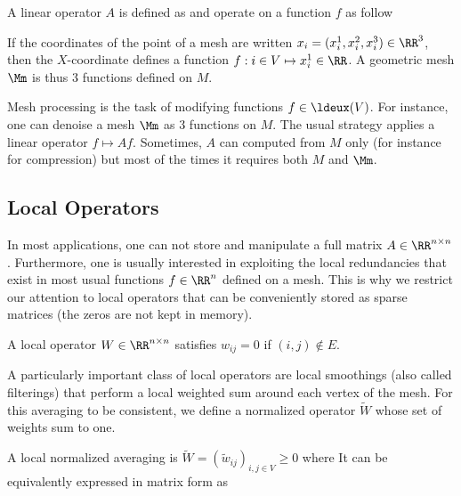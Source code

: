 \begin{defn} A linear operator $A$ is defined as 
and operate on a function $f$ as follow
\end{defn}

\begin{exmp} 
If the coordinates of the point of a mesh are written $x_i=(x_i^1,x_i^2,x_i^3) \in \RR^3$, 
then the $X$-coordinate defines a function $f: i \in V \mapsto x_i^1 \in \RR$. A geometric mesh $\Mm$ is thus 3 functions defined on $M$. 
\end{exmp}

Mesh processing is the task of modifying functions $f \in \ldeux(V)$. For instance, one can denoise a mesh $\Mm$ as 3 functions on $M$. The usual strategy applies a linear operator $f \mapsto A f$. Sometimes, $A$ can computed from $M$ only (for instance for compression) but most of the times it requires both $M$ and $\Mm$.


\subsection{Local Operators}
\label{subsec-local-operators}

In most applications, one can not store and manipulate a full matrix $A \in \RR^{n \times n}$. Furthermore, one is usually interested in exploiting the local redundancies that exist in most usual functions $f \in \RR^n$ defined on a mesh. This is why we restrict our attention to local operators that can be conveniently stored as sparse matrices (the zeros are not kept in memory). 

\begin{defn} A local operator $W \in \RR^{n \times n}$ satisfies $w_{ij}=0$ if $(i,j) \notin E$.
\end{defn}


A particularly important class of local operators are local smoothings (also called filterings) that perform a local weighted sum around each vertex of the mesh. For this averaging to be consistent, we define a normalized operator $\tilde W$ whose set of weights sum to one.

\begin{defn} A local normalized averaging is $\tilde W = (\tilde w_{ij})_{i,j \in V} \geq 0$ where
It can be equivalently expressed in matrix form as
\end{defn}

